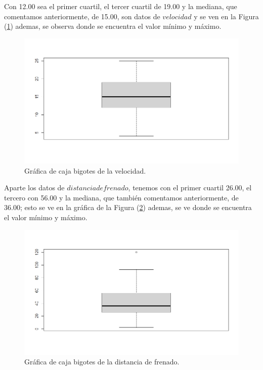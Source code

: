 \documentclass[12pt,a4paper]{article}
\begin{document}
Con 12.00 sea el primer cuartil, el tercer cuartil de 19.00 y la mediana, que comentamos anteriormente, de 15.00, son datos de $velocidad$ y se ven en la Figura (\ref{fig:boxpSpeed}) ademas, se observa donde se encuentra el valor mínimo y máximo. 

\begin{figure}
\centering
\includegraphics[scale=0.5]{boxplotSpeed}
\caption{Gráfica de caja bigotes de la velocidad.}
\label{fig:boxpSpeed}
\end{figure}

Aparte los datos de $distancia de frenado$, tenemos con el primer cuartil 26.00, el tercero con 56.00 y la mediana, que también comentamos anteriormente, de 36.00; esto se ve en la gráfica de la Figura (\ref{fig:boxpDist}) ademas, se ve donde se encuentra el valor mínimo y máximo.

\begin{figure}
\centering
\includegraphics[scale=0.5]{boxplotDist}
\caption{Gráfica de caja bigotes de la distancia de frenado.}
\label{fig:boxpDist}
\end{figure}
\end{document}
